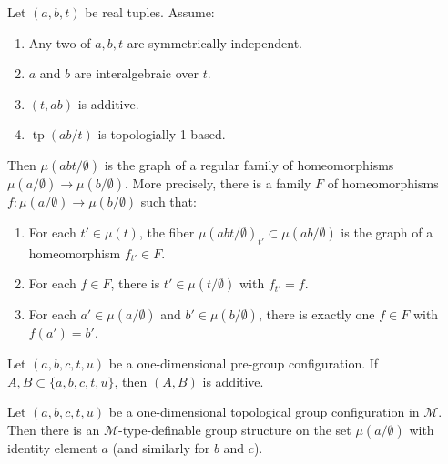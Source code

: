 \documentclass[10pt,a4paper]{amsart}
\newcommand{\tp}{\operatorname{tp}}
\begin{document}
\begin{lemma}\label{L: family of bijections} Let $(a,b,t)$ be real tuples. Assume:
\begin{enumerate}
\item Any two of $a,b,t$ are symmetrically independent.
\item $a$ and $b$ are interalgebraic over $t$.
\item $(t,ab)$ is additive. 
\item $\tp(ab/t)$ is topologially 1-based.
\end{enumerate}
Then $\mu(abt/\emptyset)$ is the graph of a regular family of homeomorphisms $\mu(a/\emptyset)\rightarrow\mu(b/\emptyset)$. More precisely, there is a family $F$ of homeomorphisms $f:\mu(a/\emptyset)\rightarrow\mu(b/\emptyset)$ such that:
\begin{enumerate}
    \item[(i)] For each $t'\in\mu(t)$, the fiber $\mu(abt/\emptyset)_{t'}\subset\mu(ab/\emptyset)$ is the graph of a homeomorphism $f_{t'}\in F$.
    \item[(ii)] For each $f\in F$, there is $t'\in\mu(t/\emptyset)$ with $f_{t'}=f$.
    \item[(iii)] For each $a'\in\mu(a/\emptyset)$ and $b'\in\mu(b/\emptyset)$, there is exactly one $f\in F$ with $f(a')=b'$.
\end{enumerate}
\end{lemma}

    \begin{corollary}\label{C: gconf is additive}
        Let $(a,b,c,t,u)$ be a one-dimensional pre-group configuration. If $A,B\subset\{a,b,c,t,u\}$, then $(A,B)$ is additive.
    \end{corollary}

    \begin{theorem}\label{T: gconf}
        Let $(a,b,c,t,u)$ be a one-dimensional topological group configuration in $\mathcal M$. Then there is an $\mathcal M$-type-definable group structure on the set $\mu(a/\emptyset)$ with identity element $a$ (and similarly for $b$ and $c$).
    \end{theorem}
\end{document}
